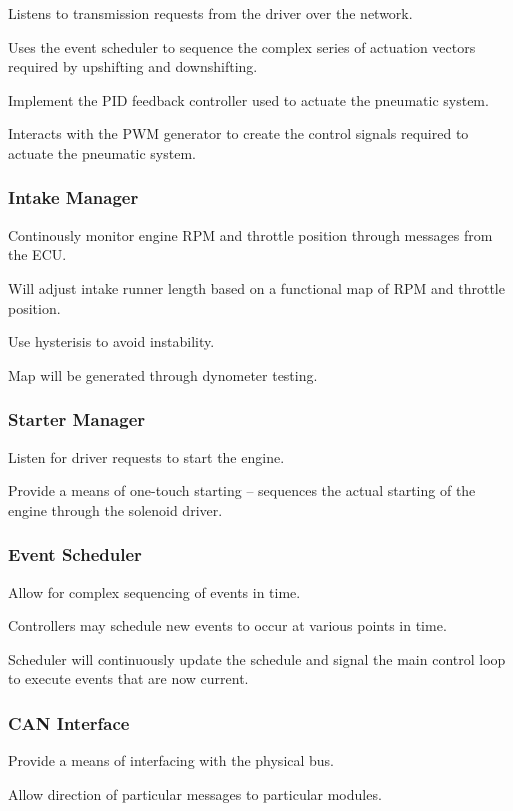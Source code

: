 Listens to transmission requests from the driver over the network.

Uses the event scheduler to sequence the complex series of actuation vectors required by upshifting and downshifting.

Implement the PID feedback controller used to actuate the pneumatic system.

Interacts with the PWM generator to create the control signals required to actuate the pneumatic system.


\subsubsection{Intake Manager}

Continously monitor engine RPM and throttle position through messages from the ECU.

Will adjust intake runner length based on a functional map of RPM and throttle position.

Use hysterisis to avoid instability.

Map will be generated through dynometer testing.


\subsubsection{Starter Manager}

Listen for driver requests to start the engine.

Provide a means of one-touch starting -- sequences the actual starting of the engine through the solenoid driver. 


\subsubsection{Event Scheduler}

Allow for complex sequencing of events in time.

Controllers may schedule new events to occur at various points in time.

Scheduler will continuously update the schedule and signal the main control loop to execute events that are now current.


\subsubsection{CAN Interface}

Provide a means of interfacing with the physical bus. 

Allow direction of particular messages to particular modules.


